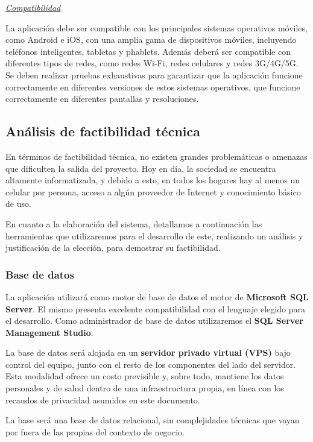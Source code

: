 \documentclass[a4paper,12pt]{article}
\newcommand{\saltolinea}{\par\vspace{\baselineskip}}
\begin{document}
    \saltolinea
    \par \noindent \textit{\underline{Compatibilidad}} 
    \saltolinea
    \par La aplicación debe ser compatible con los principales sistemas operativos móviles, como Android e iOS, con una amplia gama de dispositivos móviles, incluyendo teléfonos inteligentes, tabletas y phablets. Además deberá ser compatible con diferentes tipos de redes, como redes Wi-Fi, redes celulares y redes 3G/4G/5G. Se deben realizar pruebas exhaustivas para garantizar que la aplicación funcione correctamente en diferentes versiones de estos sistemas operativos, que funcione correctamente en diferentes pantallas y resoluciones.
    \subsection{Análisis de factibilidad técnica}
    \par En términos de factibilidad técnica, no existen grandes problemáticas o amenazas que dificulten la salida del proyecto. Hoy en día, la sociedad se encuentra altamente informatizada, y debido a esto, en todos los hogares hay al menos un celular por persona, acceso a algún proveedor de Internet y conocimiento básico de uso.
    \par En cuanto a la elaboración del sistema, detallamos a continuación las herramientas que utilizaremos para el desarrollo de este, realizando un análisis y justificación de la elección, para demostrar su factibilidad.
    \subsubsection{Base de datos}
    \par La aplicación utilizará como motor de base de datos el motor de \textbf{Microsoft SQL Server}. El mismo presenta excelente compatibilidad con el lenguaje elegido para el desarrollo. Como administrador de base de datos utilizaremos el \textbf{SQL Server Management Studio}.
    \par La base de datos será alojada en un \textbf{servidor privado virtual (VPS)} bajo control del equipo, junto con el resto de los componentes del lado del servidor. Esta modalidad ofrece un costo previsible y, sobre todo, mantiene los datos personales y de salud dentro de una infraestructura propia, en línea con los recaudos de privacidad asumidos en este documento.
    \par La base será una base de datos relacional, sin complejidades técnicas que vayan por fuera de las propias del contexto de negocio.
\end{document}
